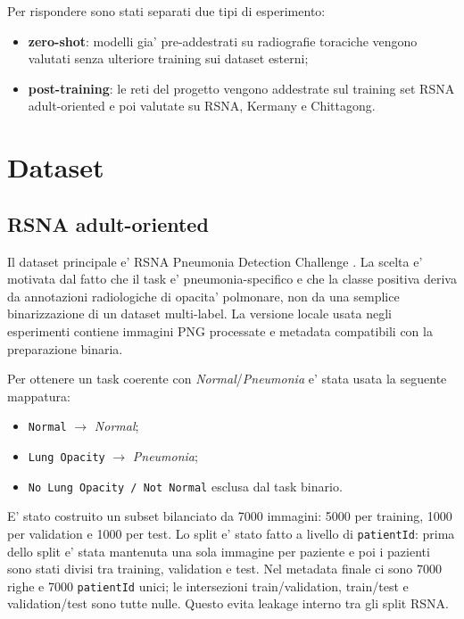 \documentclass[11pt,a4paper]{article}
\newcommand{\normal}{\textit{Normal}}
\newcommand{\pneumonia}{\textit{Pneumonia}}
\begin{document}
Per rispondere sono stati separati due tipi di esperimento:

\begin{itemize}
  \item \textbf{zero-shot}: modelli gia' pre-addestrati su radiografie
  toraciche vengono valutati senza ulteriore training sui dataset esterni;
  \item \textbf{post-training}: le reti del progetto vengono addestrate sul
  training set RSNA adult-oriented e poi valutate su RSNA, Kermany e Chittagong.
\end{itemize}

\section{Dataset}

\subsection{RSNA adult-oriented}

Il dataset principale e' RSNA Pneumonia Detection Challenge
\cite{rsna_kaggle}. La scelta e' motivata dal fatto che il task e'
pneumonia-specifico e che la classe positiva deriva da annotazioni radiologiche
di opacita' polmonare, non da una semplice binarizzazione di un dataset
multi-label. La versione locale usata negli esperimenti contiene immagini PNG
processate e metadata compatibili con la preparazione binaria.

Per ottenere un task coerente con \normal/\pneumonia{} e' stata usata la
seguente mappatura:

\begin{itemize}
  \item \texttt{Normal} $\rightarrow$ \normal;
  \item \texttt{Lung Opacity} $\rightarrow$ \pneumonia;
  \item \texttt{No Lung Opacity / Not Normal} esclusa dal task binario.
\end{itemize}

E' stato costruito un subset bilanciato da 7000 immagini: 5000 per training,
1000 per validation e 1000 per test. Lo split e' stato fatto a livello di
\texttt{patientId}: prima dello split e' stata mantenuta una sola immagine per
paziente e poi i pazienti sono stati divisi tra training, validation e test.
Nel metadata finale ci sono 7000 righe e 7000 \texttt{patientId} unici; le
intersezioni train/validation, train/test e validation/test sono tutte nulle.
Questo evita leakage interno tra gli split RSNA.
\end{document}
